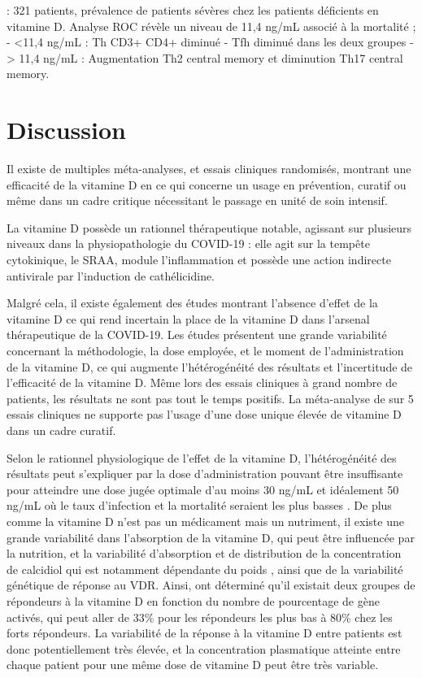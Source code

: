 \documentclass[
  a4paper,
  DIV=11,
  numbers=noendperiod,
  listof=totoc]{scrreprt}
\begin{document}
\textcite{Karonova.2022.pharmaceuticals}: 321 patients, prévalence de
patients sévères chez les patients déficients en vitamine D. Analyse ROC
révèle un niveau de 11,4 ng/mL associé à la mortalité ; - \textless11,4
ng/mL : Th CD3+ CD4+ diminué - Tfh diminué dans les deux groupes -
\textgreater{} 11,4 ng/mL : Augmentation Th2 central memory et
diminution Th17 central memory.

\section{Discussion}\label{discussion}

\textcite{Grant.2022.nutrients}

Il existe de multiples méta-analyses, et essais cliniques randomisés,
montrant une efficacité de la vitamine D en ce qui concerne un usage en
prévention, curatif ou même dans un cadre critique nécessitant le
passage en unité de soin intensif.

La vitamine D possède un rationnel thérapeutique notable, agissant sur
plusieurs niveaux dans la physiopathologie du COVID-19 : elle agit sur
la tempête cytokinique, le \ac{SRAA}, module l'inflammation et possède
une action indirecte antivirale par l'induction de cathélicidine.

Malgré cela, il existe également des études montrant l'absence d'effet
de la vitamine D ce qui rend incertain la place de la vitamine D dans
l'arsenal thérapeutique de la COVID-19. Les études présentent une grande
variabilité concernant la méthodologie, la dose employée, et le moment
de l'administration de la vitamine D, ce qui augmente l'hétérogénéité
des résultats et l'incertitude de l'efficacité de la vitamine D. Même
lors des essais cliniques à grand nombre de patients, les résultats ne
sont pas tout le temps positifs. La méta-analyse de
\textcite{Zhong.2024} sur 5 essais cliniques ne supporte pas l'usage
d'une dose unique élevée de vitamine D dans un cadre curatif.

Selon le rationnel physiologique de l'effet de la vitamine D,
l'hétérogénéité des résultats peut s'expliquer par la dose
d'administration pouvant être insuffisante pour atteindre une dose jugée
optimale d'au moins 30 ng/mL et idéalement 50 ng/mL où le taux
d'infection et la mortalité seraient les plus basses
\autocite{Wimalawansa.2022,Kaufman.2020,Borsche.2021}. De plus comme la
vitamine D n'est pas un médicament mais un nutriment, il existe une
grande variabilité dans l'absorption de la vitamine D, qui peut être
influencée par la nutrition, et la variabilité d'absorption et de
distribution de la concentration de calcidiol qui est notamment
dépendante du poids \autocite{Ekwaru.2014}, ainsi que de la variabilité
génétique de réponse au VDR. Ainsi, \textcite{Vukić.2015} ont déterminé
qu'il existait deux groupes de répondeurs à la vitamine D en fonction du
nombre de pourcentage de gène activés, qui peut aller de 33\% pour les
répondeurs les plus bas à 80\% chez les forts répondeurs. La variabilité
de la réponse à la vitamine D entre patients est donc potentiellement
très élevée, et la concentration plasmatique atteinte entre chaque
patient pour une même dose de vitamine D peut être très variable.
\end{document}
